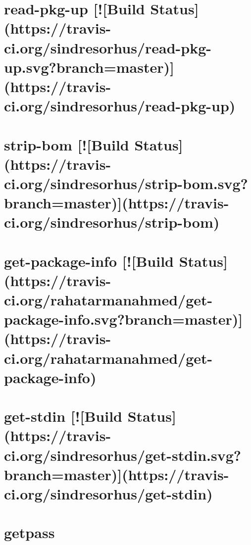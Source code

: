 \documentclass[twoside]{book}
\newcommand{\+}{\discretionary{\mbox{\scriptsize$\hookleftarrow$}}{}{}}
\begin{document}
\chapter{read-\/pkg-\/up \mbox{[}!\mbox{[}Build Status\mbox{]}(https\+://travis-\/ci.org/sindresorhus/read-\/pkg-\/up.svg?branch=master)\mbox{]}(https\+://travis-\/ci.org/sindresorhus/read-\/pkg-\/up)}
\label{md_dsmacc_examples_DRmerge_node_modules_get-package-info_node_modules_read-pkg-up_readme}

\chapter{strip-\/bom \mbox{[}!\mbox{[}Build Status\mbox{]}(https\+://travis-\/ci.org/sindresorhus/strip-\/bom.svg?branch=master)\mbox{]}(https\+://travis-\/ci.org/sindresorhus/strip-\/bom)}
\label{md_dsmacc_examples_DRmerge_node_modules_get-package-info_node_modules_strip-bom_readme}

\chapter{get-\/package-\/info \mbox{[}!\mbox{[}Build Status\mbox{]}(https\+://travis-\/ci.org/rahatarmanahmed/get-\/package-\/info.svg?branch=master)\mbox{]}(https\+://travis-\/ci.org/rahatarmanahmed/get-\/package-\/info)}
\label{md_dsmacc_examples_DRmerge_node_modules_get-package-info_README}

\chapter{get-\/stdin \mbox{[}!\mbox{[}Build Status\mbox{]}(https\+://travis-\/ci.org/sindresorhus/get-\/stdin.svg?branch=master)\mbox{]}(https\+://travis-\/ci.org/sindresorhus/get-\/stdin)}
\label{md_dsmacc_examples_DRmerge_node_modules_get-stdin_readme}

\chapter{getpass}
\label{md_dsmacc_examples_DRmerge_node_modules_getpass_README}

\end{document}
